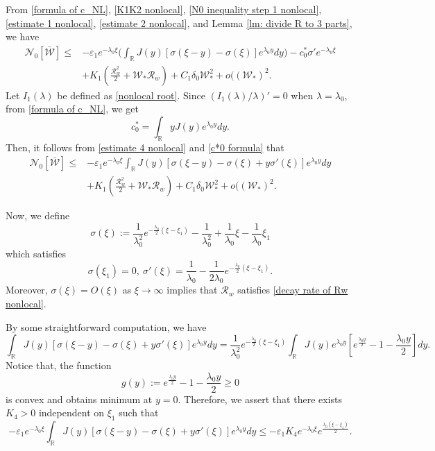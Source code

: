 \documentclass[11pt,a4paper]{article}
\numberwithin{equation}{section}
\numberwithin{figure}{section}
\begin{document}
From \eqref{formula of c_NL}, \eqref{K1K2 nonlocal}, \eqref{N0 inequality step 1 nonlocal}, \eqref{estimate 1 nonlocal}, \eqref{estimate 2 nonlocal}, and Lemma \ref{lm: divide R to 3 parts}, we have
\begin{equation}\label{estimate 4 nonlocal}
\begin{aligned}
\mathcal{N}_0[\bar{\mathcal{W}}]\le &-\varepsilon_1e^{-\lambda_0\xi}\Big(\int_{\mathbb{R}}J(y)[\sigma(\xi-y)-\sigma(\xi)] e^{\lambda_0y}dy\Big)-c^*_0\sigma'e^{-\lambda_0\xi}\\
&+K_1(\frac{\mathcal{R}_w^2}{2}+\mathcal{W}_*\mathcal{R}_w)+C_1\delta_0\mathcal{W}_*^2+o((\mathcal{W}_*)^2.
\end{aligned}
\end{equation}
Let $I_1(\lambda)$ be defined as \eqref{nonlocal root}. Since $(I_1(\lambda)/\lambda)'=0$ when $\lambda=\lambda_0$, from \eqref{formula of c_NL}, we get
\begin{equation}\label{c*0 formula}
c^*_0=\int_{\mathbb{R}}yJ(y)e^{\lambda_0y}dy.
\end{equation}
Then, it follows from \eqref{estimate 4 nonlocal} and \eqref{c*0 formula} that
\begin{equation}\label{estimate 3 nonlocal}
\begin{aligned}
\mathcal{N}_0[\bar{\mathcal{W}}]\le &-\varepsilon_1e^{-\lambda_0\xi}\int_{\mathbb{R}}J(y)[\sigma(\xi-y)-\sigma(\xi)+y\sigma'(\xi)] e^{\lambda_0y}dy\\
&+K_1(\frac{\mathcal{R}_w^2}{2}+\mathcal{W}_*\mathcal{R}_w)+C_1\delta_0\mathcal{W}_*^2+o((\mathcal{W}_*)^2.
\end{aligned}
\end{equation}

Now, we define
$$\sigma(\xi):=\frac{1}{\lambda_0^2}e^{-\frac{\lambda_0}{2}(\xi-\xi_1)}-\frac{1}{\lambda_0^2}+\frac{1}{\lambda_0}\xi-\frac{1}{\lambda_0}\xi_1$$
which satisfies 
$$\sigma(\xi_1)=0,\ \sigma'(\xi)=\frac{1}{\lambda_0}-\frac{1}{2\lambda_0}e^{-\frac{\lambda_0}{2}(\xi-\xi_1)}.$$
 Moreover, $\sigma(\xi)= O(\xi)$ as $\xi\to\infty$ implies that $\mathcal{R}_w$ satisfies \eqref{decay rate of Rw nonlocal}.

By some straightforward computation, we have
\begin{equation*}
\int_{\mathbb{R}}J(y)[\sigma(\xi-y)-\sigma(\xi)+y\sigma'(\xi)] e^{\lambda_0y}dy=\frac{1}{\lambda_0^2}e^{-\frac{\lambda_0}{2}(\xi-\xi_1)}\int_{\mathbb{R}}J(y)e^{\lambda_0 y}[e^{\frac{\lambda_0y}{2}}-1-\frac{\lambda_0y}{2}]dy.
\end{equation*}
Notice that, the function 
$$g(y):=e^{\frac{\lambda_0y}{2}}-1-\frac{\lambda_0y}{2}\ge 0$$
 is convex and obtains minimum at $y=0$. Therefore, we assert that there exists $K_4>0$ independent on $\xi_1$ such that
\begin{equation}\label{estimate K4 nonlocal}
-\varepsilon_1e^{-\lambda_0\xi}\int_{\mathbb{R}}J(y)[\sigma(\xi-y)-\sigma(\xi)+y\sigma'(\xi)] e^{\lambda_0y}dy\le -\varepsilon_1K_4e^{-\lambda_0\xi}e^{\frac{\lambda_0(\xi-\xi_1)}{2}}.
\end{equation}
\end{document}
